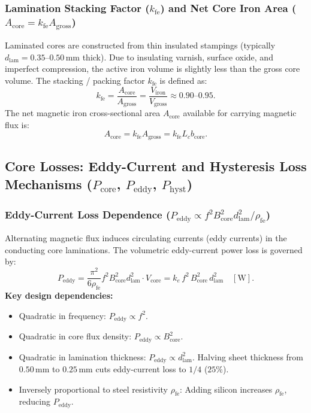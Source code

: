 \subsubsection{Lamination Stacking Factor ($k_{\mathrm{fe}}$) and Net Core Iron Area ($A_{\mathrm{core}} = k_{\mathrm{fe}} A_{\mathrm{gross}}$)}
Laminated cores are constructed from thin insulated stampings (typically $d_{\mathrm{lam}} = 0.35\text{--}0.50\,\mathrm{mm}$ thick).
Due to insulating varnish, surface oxide, and imperfect compression, the active iron volume is slightly less than the gross core volume.
The stacking / packing factor $k_{\mathrm{fe}}$ is defined as:
\[
k_{\mathrm{fe}} = \frac{A_{\mathrm{core}}}{A_{\mathrm{gross}}} = \frac{V_{\mathrm{iron}}}{V_{\mathrm{gross}}} \approx 0.90\text{--}0.95.
\]
The net magnetic iron cross-sectional area $A_{\mathrm{core}}$ available for carrying magnetic flux is:
\[
A_{\mathrm{core}} = k_{\mathrm{fe}} A_{\mathrm{gross}} = k_{\mathrm{fe}} L_c b_{\mathrm{core}}.
\]

\subsection{Core Losses: Eddy-Current and Hysteresis Loss Mechanisms ($P_{\mathrm{core}}$, $P_{\mathrm{eddy}}$, $P_{\mathrm{hyst}}$)}

\subsubsection{Eddy-Current Loss Dependence ($P_{\mathrm{eddy}} \propto f^2 B_{\mathrm{core}}^2 d_{\mathrm{lam}}^2 / \rho_{\mathrm{fe}}$)}
Alternating magnetic flux induces circulating currents (eddy currents) in the conducting core laminations.
The volumetric eddy-current power loss is governed by:
\[
P_{\mathrm{eddy}} = \frac{\pi^2}{6 \rho_{\mathrm{fe}}} f^2 B_{\mathrm{core}}^2 d_{\mathrm{lam}}^2 \cdot V_{\mathrm{core}} = k_e\,f^2\,B_{\mathrm{core}}^2\,d_{\mathrm{lam}}^2\quad[\mathrm{W}].
\]
\textbf{Key design dependencies:}
\begin{itemize}
  \item Quadratic in frequency: $P_{\mathrm{eddy}} \propto f^2$.
  \item Quadratic in core flux density: $P_{\mathrm{eddy}} \propto B_{\mathrm{core}}^2$.
  \item Quadratic in lamination thickness: $P_{\mathrm{eddy}} \propto d_{\mathrm{lam}}^2$. Halving sheet thickness from $0.50\,\mathrm{mm}$ to $0.25\,\mathrm{mm}$ cuts eddy-current loss to $1/4$ ($25\%$).
  \item Inversely proportional to steel resistivity $\rho_{\mathrm{fe}}$: Adding silicon increases $\rho_{\mathrm{fe}}$, reducing $P_{\mathrm{eddy}}$.
\end{itemize}

